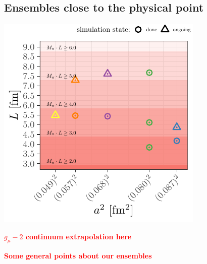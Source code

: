 \documentclass[a0,portrait]{a0poster}
\begin{document}
\begin{multicols}{2}
    \section{Ensembles close to the physical point}
    \begin{minipage}{0.49\linewidth}
      \includegraphics[width=\linewidth]{ensembles_phys_point}
    \end{minipage}
    \hfill
    \begin{minipage}{0.49\linewidth}
      \textcolor{red}{\textbf{$g_\mu-2$ continuum extrapolation here}}
    \end{minipage}

    \textcolor{red}{\textbf{Some general points about our ensembles}}
    

\end{multicols}
\end{document}
